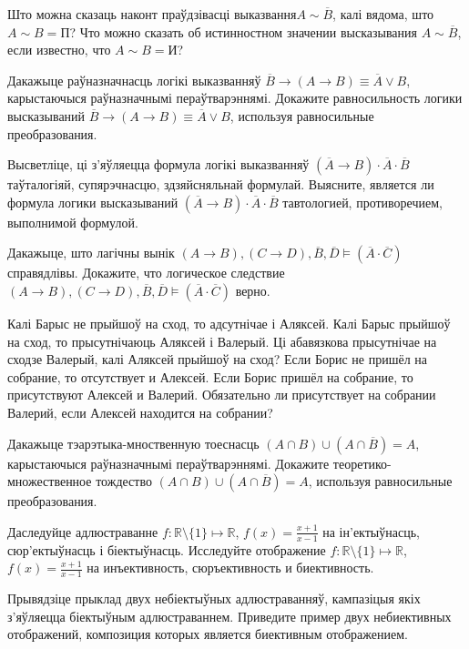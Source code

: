 \begin{problemList}

\problemItemSimple
{Што можна сказаць наконт праўдзівасці выказвання$A \sim \overline{B}$, калі вядома, што $A \sim B = \mbox{П}$?}
{Что можно сказать об истинностном значении высказывания $A \sim \overline{B}$, если известно, что $A \sim B = \mbox{И}$?}

\bigskip

\problemItemSimple
{Дакажыце раўназначнасць логікі выказванняў $\overline{B} \to (A \to B) \equiv \overline{A} \vee B$, карыстаючыся раўназначнымі пераўтварэннямі.}
{Докажите равносильность логики высказываний $\overline{B} \to (A \to B) \equiv \overline{A} \vee B$, используя равносильные преобразования.}

\bigskip

\problemItemSimple
{Высветліце, ці з'яўляецца формула логікі выказванняў $(\overline{A} \to B) \cdot \overline{A} \cdot \overline{B}$ таўталогіяй, супярэчнасцю, здзяйсняльнай формулай.}
{Выясните, является ли формула логики высказываний $(\overline{A} \to B) \cdot \overline{A} \cdot \overline{B}$ тавтологией, противоречием, выполнимой формулой.}

\bigskip

\problemItemSimple
{Дакажыце, што лагічны вынік $(A \to B), (C \to D), \overline{B}, \overline{D} \models (\overline{A} \cdot \overline{C})$ справядлівы.}
{Докажите, что логическое следствие $(A \to B), (C \to D), \overline{B}, \overline{D} \models (\overline{A} \cdot \overline{C})$ верно.}

\bigskip

\problemItemSimple
{Калі Барыс не прыйшоў на сход, то адсутнічае і Аляксей. Калі Барыс прыйшоў на сход, то прысутнічаюць Аляксей і Валерый. Ці абавязкова прысутнічае на сходзе Валерый, калі Аляксей прыйшоў на сход?}
{Если Борис не пришёл на собрание, то отсутствует и Алексей. Если Борис пришёл на собрание, то присутствуют Алексей и Валерий. Обязательно ли присутствует на собрании Валерий, если Алексей находится на собрании?}

\bigskip

\problemItemSimple
{Дакажыце тэарэтыка-мноственную тоеснасць $(A \cap B) \cup (A \cap \overline{B}) = A$, карыстаючыся раўназначнымі пераўтварэннямі.}
{Докажите теоретико-множественное тождество $(A \cap B) \cup (A \cap \overline{B}) = A$, используя равносильные преобразования.}

\bigskip

\problemItemSimple
{Даследуйце адлюстраванне $f: \mathbb{R} \setminus \{1\} \mapsto \mathbb{R}$, $f(x) = \frac{x+1}{x-1}$ на ін'ектыўнасць, сюр'ектыўнасць і біектыўнасць. }
{Исследуйте отображение $f: \mathbb{R} \setminus \{1\} \mapsto \mathbb{R}$, $f(x) = \frac{x+1}{x-1}$ на инъективность, сюръективность и биективность.}

\bigskip

\problemItemSimple
{Прывядзіце прыклад двух небіектыўных адлюстраванняў, кампазіцыя якіх з'яўляецца біектыўным адлюстраваннем.}
{Приведите пример двух небиективных отображений, композиция которых является биективным отображением.}

\end{problemList}


